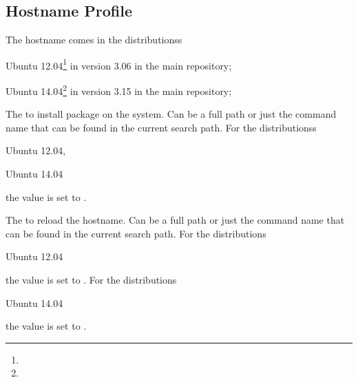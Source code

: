 \subsection{Hostname Profile}

The hostname comes in the distributionss 
\begin{compactitem}
\item[\TheDistribution{ubuntu}] Ubuntu 12.04\footnote{\TheUbuntuPreciseLTSDate} in version 3.06 in the main repository;
\item[\TheDistribution{ubuntu}] Ubuntu 14.04\footnote{\TheUbuntuTrustyLTSDate} in version 3.15 in the main repository;
\end{compactitem}


The  to install package on the system. Can be a full path or
just the command name that can be found in the current search path. 
For the distributionss 
\begin{inparaitem}
\item[\TheDistribution{ubuntu}] Ubuntu 12.04,
\item[\TheDistribution{ubuntu}] Ubuntu 14.04
\end{inparaitem}
the value is set to .


The  to reload the hostname. Can be a full path or
just the command name that can be found in the current search path.
For the distributions
\begin{inparaitem}
\item[\TheDistribution{ubuntu}] Ubuntu 12.04
\end{inparaitem}
the value is set to .
For the distributions
\begin{inparaitem}
\item[\TheDistribution{ubuntu}] Ubuntu 14.04
\end{inparaitem}
the value is set to .


